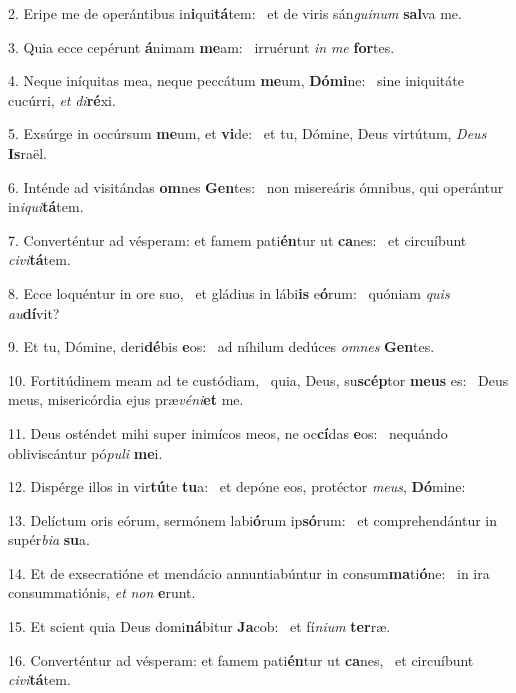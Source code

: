 2. Eripe me de operántibus in\textbf{i}qui\textbf{tá}tem: \ast\  et de viris sán\textit{gui}\textit{num} \textbf{sal}va me.\

3. Quia ecce cepérunt \textbf{á}nimam \textbf{me}am: \ast\  irruérunt \textit{in} \textit{me} \textbf{for}tes.\

4. Neque iníquitas mea, neque peccátum \textbf{me}um, \textbf{Dó}\textbf{mi}ne: \ast\  sine iniquitáte cucúrri, \textit{et} \textit{di}\textbf{ré}xi.\

5. Exsúrge in occúrsum \textbf{me}um, et \textbf{vi}de: \ast\  et tu, Dómine, Deus virtútum, \textit{De}\textit{us} \textbf{Is}raël.\

6. Inténde ad visitándas \textbf{om}nes \textbf{Gen}tes: \ast\  non misereáris ómnibus, qui operántur in\textit{i}\textit{qui}\textbf{tá}tem.\

7. Converténtur ad vésperam: et famem pati\textbf{én}tur ut \textbf{ca}nes: \ast\  et circuíbunt \textit{ci}\textit{vi}\textbf{tá}tem.\

8. Ecce loquéntur in ore suo, \dag\  et gládius in lábi\textbf{is} e\textbf{ó}rum: \ast\  quóniam \textit{quis} \textit{au}\textbf{dí}vit?\

9. Et tu, Dómine, deri\textbf{dé}bis \textbf{e}os: \ast\  ad níhilum dedúces \textit{om}\textit{nes} \textbf{Gen}tes.\

10. Fortitúdinem meam ad te custódiam, \dag\  quia, Deus, su\textbf{scép}tor \textbf{me}\textbf{us} es: \ast\  Deus meus, misericórdia ejus præ\textit{vé}\textit{ni}\textbf{et} me.\

11. Deus osténdet mihi super inimícos meos, ne oc\textbf{cí}das \textbf{e}os: \ast\  nequándo obliviscántur pó\textit{pu}\textit{li} \textbf{me}i.\

12. Dispérge illos in vir\textbf{tú}te \textbf{tu}a: \ast\  et depóne eos, protéctor \textit{me}\textit{us}, \textbf{Dó}mine:\

13. Delíctum oris eórum, sermónem labi\textbf{ó}rum ip\textbf{só}rum: \ast\  et comprehendántur in supér\textit{bi}\textit{a} \textbf{su}a.\

14. Et de exsecratióne et mendácio annuntiabúntur in consum\textbf{ma}ti\textbf{ó}ne: \ast\  in ira consummatiónis, \textit{et} \textit{non} \textbf{e}runt.\

15. Et scient quia Deus domi\textbf{ná}bitur \textbf{Ja}cob: \ast\  et fí\textit{ni}\textit{um} \textbf{ter}ræ.\

16. Converténtur ad vésperam: et famem pati\textbf{én}tur ut \textbf{ca}nes, \ast\  et circuíbunt \textit{ci}\textit{vi}\textbf{tá}tem.\

